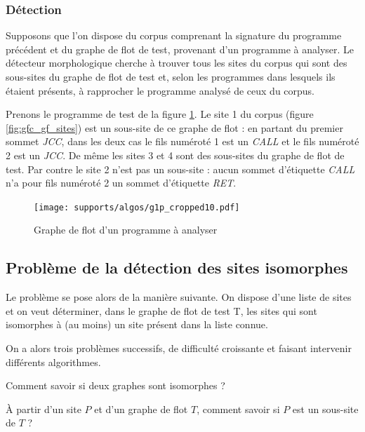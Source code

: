 \subsubsection{Détection}
Supposons que l'on dispose du corpus comprenant la signature du programme précédent et du graphe de flot de test, provenant d'un programme à analyser.
Le détecteur morphologique cherche à trouver tous les sites du corpus qui sont des sous-sites du graphe de flot de test et, selon les programmes dans lesquels ils étaient présents, à rapprocher le programme analysé de ceux du corpus.

Prenons le programme de test de la figure \ref{fig:am_exemple_gf_test}.
Le site 1 du corpus (figure \ref{fig:gfc_gf_sites}) est un sous-site de ce graphe de flot : en partant du premier sommet \emph{JCC}, dans les deux cas le fils numéroté 1 est un \emph{CALL} et le fils numéroté 2 est un \emph{JCC}.
De même les sites 3 et 4 sont des sous-sites du graphe de flot de test. Par contre le site 2 n'est pas un sous-site : aucun sommet d'étiquette \emph{CALL} n'a pour fils numéroté 2 un sommet d'étiquette \emph{RET}.


\begin{figure}[h]
\begin{center}
\texttt{[image: supports/algos/g1p\_cropped10.pdf]}
\end{center}
\caption{Graphe de flot d'un programme à analyser}
\label{fig:am_exemple_gf_test}
\end{figure}


\subsection{Problème de la détection des sites isomorphes}
Le problème se pose alors de la manière suivante. On dispose d'une liste de sites et %
on veut déterminer, dans le graphe de flot de test T, les sites qui sont isomorphes à (au moins) un site présent dans la liste connue. 

On a alors trois problèmes successifs, de difficulté croissante et faisant intervenir différents algorithmes.
\begin{pb}\label{pbisog}
 Comment savoir si deux graphes sont isomorphes ?
\end{pb}

\begin{pb}\label{pbisosg}
 À partir d'un site $P$ et d'un graphe de flot $T$, comment savoir si $P$ est un sous-site de $T$ ?
\end{pb}

